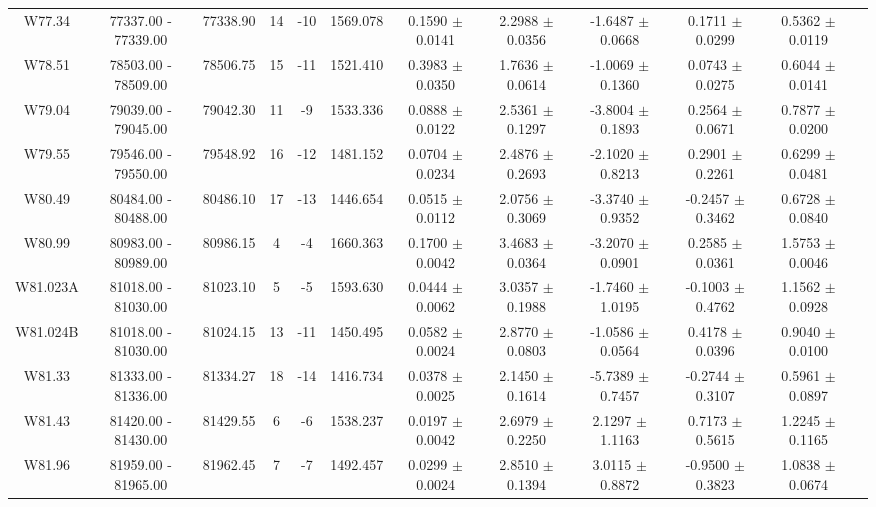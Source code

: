 \documentclass{article}
\begin{document}
\begin{table}[h]
{\begin{tabular}{|c|c|c|c|c|c|c|c|c|c|c|c|}
W77.34 & 77337.00 - 77339.00 & 77338.90 & 14 & -10 & 1569.078 & 0.1590 $\pm$ 0.0141 & 2.2988 $\pm$ 0.0356 & -1.6487 $\pm$ 0.0668 & 0.1711 $\pm$ 0.0299 & 0.5362 $\pm$ 0.0119 \\

W78.51 & 78503.00 - 78509.00 & 78506.75 & 15 & -11 & 1521.410 & 0.3983 $\pm$ 0.0350 & 1.7636 $\pm$ 0.0614 &  -1.0069 $\pm$ 0.1360 & 0.0743 $\pm$ 0.0275 & 0.6044 $\pm$ 0.0141 \\

W79.04 & 79039.00 - 79045.00 & 79042.30 & 11 & -9 & 1533.336 & 0.0888 $\pm$ 0.0122 & 2.5361 $\pm$ 0.1297 & -3.8004 $\pm$ 0.1893 & 0.2564 $\pm$ 0.0671 & 0.7877 $\pm$ 0.0200 \\

W79.55 & 79546.00 - 79550.00 & 79548.92 & 16 & -12 & 1481.152 & 0.0704 $\pm$ 0.0234 & 2.4876 $\pm$ 0.2693 &  -2.1020 $\pm$ 0.8213 & 0.2901 $\pm$ 0.2261 & 0.6299 $\pm$ 0.0481 \\

W80.49 & 80484.00 - 80488.00 & 80486.10 & 17 & -13 & 1446.654 & 0.0515 $\pm$ 0.0112 & 2.0756 $\pm$ 0.3069 &  -3.3740 $\pm$ 0.9352 & -0.2457 $\pm$ 0.3462 & 0.6728 $\pm$ 0.0840 \\

W80.99 & 80983.00 - 80989.00 & 80986.15 & 4 & -4 & 1660.363 & 0.1700 $\pm$ 0.0042 & 3.4683 $\pm$ 0.0364 &  -3.2070 $\pm$ 0.0901 & 0.2585 $\pm$ 0.0361 & 1.5753 $\pm$ 0.0046 \\

W81.023A & 81018.00 - 81030.00 & 81023.10 & 5 & -5 & 1593.630 & 0.0444 $\pm$ 0.0062 & 3.0357 $\pm$ 0.1988 &  -1.7460 $\pm$ 1.0195 & -0.1003 $\pm$ 0.4762 & 1.1562 $\pm$ 0.0928 \\

W81.024B & 81018.00 - 81030.00 & 81024.15 & 13 & -11 & 1450.495 & 0.0582 $\pm$ 0.0024 &  2.8770 $\pm$ 0.0803 & -1.0586 $\pm$ 0.0564 & 0.4178 $\pm$ 0.0396 & 0.9040 $\pm$ 0.0100 \\
         
W81.33 & 81333.00 - 81336.00 & 81334.27 & 18 & -14 & 1416.734 & 0.0378 $\pm$ 0.0025 & 2.1450 $\pm$ 0.1614 & -5.7389 $\pm$ 0.7457 & -0.2744 $\pm$ 0.3107 & 0.5961 $\pm$ 0.0897 \\

W81.43 & 81420.00 - 81430.00 & 81429.55 & 6 & -6 & 1538.237 & 0.0197 $\pm$ 0.0042 & 2.6979 $\pm$ 0.2250 &  2.1297 $\pm$ 1.1163 & 0.7173 $\pm$ 0.5615 & 1.2245 $\pm$ 0.1165 \\

W81.96 & 81959.00 - 81965.00 & 81962.45 & 7 & -7 & 1492.457 & 0.0299 $\pm$ 0.0024 & 2.8510 $\pm$ 0.1394 &  3.0115 $\pm$ 0.8872 & -0.9500 $\pm$ 0.3823 & 1.0838 $\pm$ 0.0674 \\


\end{tabular}}
\end{table}
\end{document}
